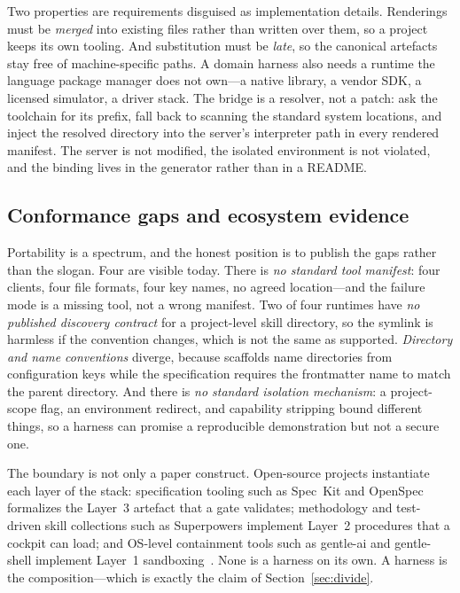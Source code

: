 \documentclass[10pt,a4paper]{article}
\theoremstyle{definition}
\theoremstyle{plain}
\theoremstyle{principle}
\begin{document}
Two properties are requirements disguised as implementation details. Renderings must be
\emph{merged} into existing files rather than written over them, so a project keeps its own
tooling. And substitution must be \emph{late}, so the canonical artefacts stay free of
machine-specific paths. A domain harness also needs a runtime the language package manager does
not own---a native library, a vendor SDK, a licensed simulator, a driver stack. The bridge is a
resolver, not a patch: ask the toolchain for its prefix, fall back to scanning the standard system
locations, and inject the resolved directory into the server's interpreter path in every rendered
manifest. The server is not modified, the isolated environment is not violated, and the binding
lives in the generator rather than in a README.

\subsection{Conformance gaps and ecosystem evidence}

Portability is a spectrum, and the honest position is to publish the gaps rather than the slogan.
Four are visible today. There is \emph{no standard tool manifest}: four clients, four file formats,
four key names, no agreed location---and the failure mode is a missing tool, not a wrong manifest. Two
of four runtimes have \emph{no published discovery contract} for a project-level skill directory,
so the symlink is harmless if the convention changes, which is not the same as supported.
\emph{Directory and name conventions} diverge, because scaffolds name directories from
configuration keys while the specification requires the frontmatter name to match the parent
directory. And there is \emph{no standard isolation mechanism}: a project-scope flag, an
environment redirect, and capability stripping bound different things, so a harness can promise a
reproducible demonstration but not a secure one.

The boundary is not only a paper construct. Open-source projects instantiate each layer of the
stack: specification tooling such as Spec~Kit and OpenSpec formalizes the Layer~3 artefact that a
gate validates; methodology and test-driven skill collections such as Superpowers implement
Layer~2 procedures that a cockpit can load; and OS-level containment tools such as
gentle-ai and gentle-shell implement Layer~1 sandboxing~\cite{ecosystem}. None is a harness on its
own.
A harness is the composition---which is exactly the claim of Section~\ref{sec:divide}.
\end{document}
